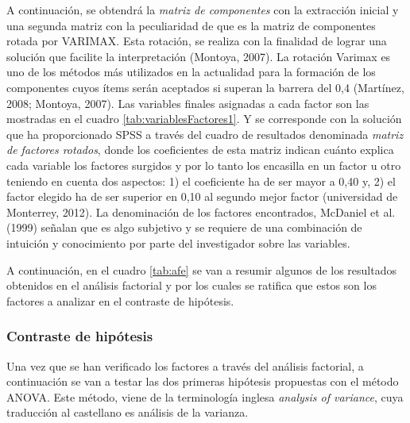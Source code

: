 A continuación, se obtendrá la \emph{matriz de componentes} con la extracción inicial y una segunda matriz con la peculiaridad de que es la matriz de componentes rotada por VARIMAX. Esta rotación, se realiza con la finalidad de lograr una solución que facilite la interpretación (Montoya, 2007). La rotación Varimax es uno de los métodos más utilizados en la actualidad para la formación de los componentes cuyos ítems serán aceptados si superan la barrera del 0,4 (Martínez, 2008; Montoya, 2007). Las variables finales asignadas a cada factor son las mostradas en el cuadro \ref{tab:variablesFactores1}. Y se corresponde con la solución que ha proporcionado SPSS a través del cuadro de resultados denominada \emph{matriz de factores rotados}, donde los coeficientes de esta matriz indican cuánto explica cada variable los factores surgidos y por lo tanto los encasilla en un factor u otro teniendo en cuenta dos aspectos: 1) el coeficiente ha de ser mayor a 0,40 y, 2) el factor elegido ha de ser superior en 0,10 al segundo mejor factor (universidad de Monterrey, 2012). La denominación de los factores encontrados, McDaniel et al. (1999) señalan que es algo subjetivo y se requiere de una combinación de intuición y conocimiento por parte del investigador sobre las variables.



\newpage

A continuación, en el cuadro \ref{tab:afe} se van a resumir algunos de los resultados obtenidos en el análisis factorial y por los cuales se ratifica que estos son los factores a analizar en el contraste de hipótesis.



\newpage


\subsubsection{Contraste de hipótesis}

Una vez que se han verificado los factores a través del análisis factorial, a continuación se van a testar las dos primeras hipótesis propuestas con el método ANOVA. Este método, viene de la terminología inglesa \emph{analysis of variance}, cuya traducción al castellano es análisis de la varianza.

